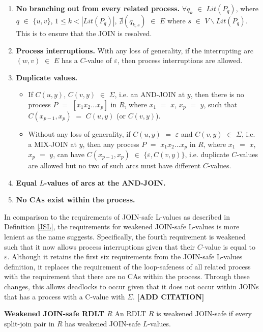 \begin{defn}
\begin{itemize}
\begin{enumerate}
            \item \textbf{No branching out from every related process.} $ 
            \forall q_k $ $ \in $ $ Lit(P_q) $, where $ q $ $ \in $ $ \{u,v\} $, $ 1 \leq k < |Lit(P_q)| $, $ \nexists (q_{k,s}) $ $ \in $ $ E $ where $ s $ $ \in $ $ V \backslash Lit(P_q) $. This is to ensure that the JOIN is resolved.
            \item \textbf{Process interruptions.} With any loss of generality, if the interrupting arc $ (w,v) $ $ \in $ $ E $ has a $ C $-value of $ \varepsilon $, then process interruptions are allowed.
            \item \textbf{Duplicate values.} 
            \begin{itemize}
                \item If $ C(u,y) $, $ C(v,y) $ $ \in $ $ \Sigma $, i.e. an AND-JOIN at $ y $, then there is no process $ P $ $ = $ $ [x_1 x_2 \ldots x_p] $ in $ R $, where $ x_1 $ $ = $ $ x $, $ x_p $ $ = $ $ y $, such that $ C(x_{p-1}, x_p ) $ $ = $ $ C(u,y) $ (or $ C(v,y) $).
                \item Without any loss of generality, if $ C(u,y) $ $ = $ $ \varepsilon $ and $ C(v,y) $ $ \in $ $ \Sigma $, i.e. a MIX-JOIN at $ y $, then any process $ P $ $ = $ $ x_1 x_2 \ldots x_p $ in $ R $, where $ x_1 $ $ = $ $ x $, $ x_p $ $ = $ $ y $, can have $ C(x_{p-1},x_p) $ $ \in $ $ \{ \varepsilon, C(v,y) \} $, i.e. duplicate $ C $-values are allowed but no two of such arcs must have different $ C $-values.
            \end{itemize}
            \item \textbf{Equal $ L $-values of arcs at the AND-JOIN.}
            \item \textbf{No CAs exist within the process.} 
        \end{enumerate}
    \end{itemize}
\end{defn}

In comparison to the requirements of JOIN-safe L-values as described in Definition \ref{JSL}, the requirements for weakened JOIN-safe L-values is more lenient as the name suggests. Specifically, the fourth requirement is weakened such that it now allows process interruptions given that their $ C $-value is equal to $ \varepsilon $. Although it retains the first six requirements from the JOIN-safe L-values definition, it replaces the requirement of the loop-safeness of all related process with the requirement that there are no CAs within the process. Through these changes, this allows deadlocks to occur given that it does not occur within JOINs that has a process with a C-value with $ \Sigma $. 
 \textbf{[ADD CITATION]}
\begin{defn}\textbf{Weakened JOIN-safe RDLT $ R $}
    \label{WJRDLT}
    An RDLT $ R $ is weakened JOIN-safe if every split-join pair in $ R $ has weakened JOIN-safe $ L $-values.
\end{defn}

